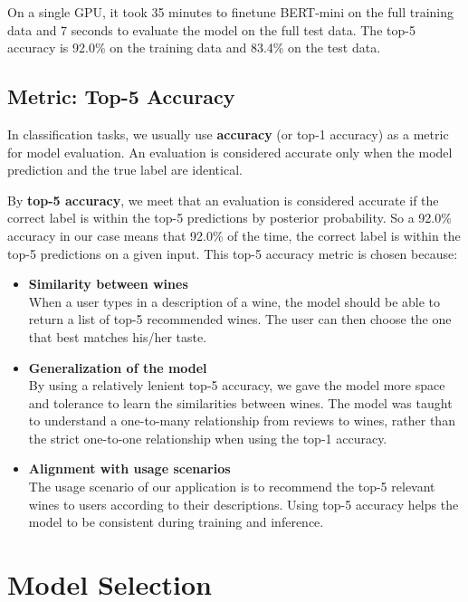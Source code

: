 \documentclass[
	a4paper,
	fontsize=10pt, %
	twoside=false, %
	secnumdepth=2, %
]{kaohandt}
\begin{document}
On a single GPU, it took 35 minutes to finetune BERT-mini on the full training data and 7 seconds to evaluate the model on the full test data. The top-5 accuracy is 92.0\% on the training data and 83.4\% on the test data.

\subsection{Metric: Top-5 Accuracy}

In classification tasks, we usually use \textbf{accuracy} (or top-1 accuracy) as a metric for model evaluation. An evaluation is considered accurate only when the model prediction and the true label are identical.

By \textbf{top-5 accuracy}, we meet that an evaluation is considered accurate if the correct label is within the top-5 predictions by posterior probability. So a 92.0\% accuracy in our case means that 92.0\% of the time, the correct label is within the top-5 predictions on a given input. This top-5 accuracy metric is chosen because:

\begin{itemize}
	\item \textbf{Similarity between wines} \\
	When a user types in a description of a wine, the model should be able to return a list of top-5 recommended wines. The user can then choose the one that best matches his/her taste.
	\item \textbf{Generalization of the model} \\
	By using a relatively lenient top-5 accuracy, we gave the model more space and tolerance to learn the similarities between wines. The model was taught to understand a one-to-many relationship from reviews to wines, rather than the strict one-to-one relationship when using the top-1 accuracy.
	\item \textbf{Alignment with usage scenarios} \\
	The usage scenario of our application is to recommend the top-5 relevant wines to users according to their descriptions. Using top-5 accuracy helps the model to be consistent during training and inference.
\end{itemize}

\newpage

\section{Model Selection}
\end{document}
